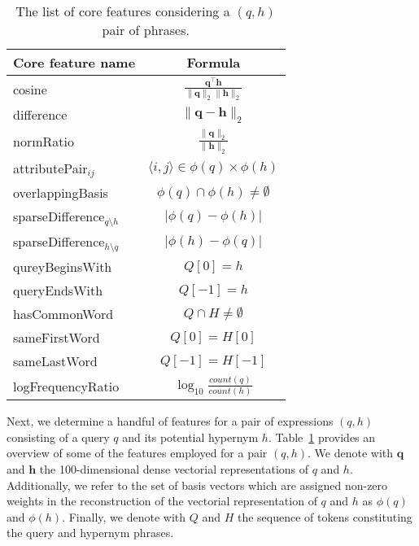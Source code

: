 \documentclass[11pt,a4paper]{article}
\begin{document}
\begin{table}
	\begin{tabular}{lc}
    \toprule
		Core feature name   & Formula \\  
    \midrule
		{cosine}            & $\frac{\mathbf{q}^\intercal \mathbf{h}}{\lVert \mathbf{q} \rVert_2\lVert \mathbf{h} \rVert_2}$ \\ %
		{difference}        & $\lVert \mathbf{q} - \mathbf{h} \rVert_2$ \\ %
		{normRatio}         & $\frac{\lVert \mathbf{q}\rVert_2}{\lVert \mathbf{h} \rVert_2}$ \\ %
    \midrule
    attributePair$_{ij}$      & $\langle i,j\rangle\in\phi(q)\times\phi(h)$ \\ %
		{overlappingBasis}  & $\phi(q) \cap \phi(h) \neq \emptyset$ \\ %
		{sparseDifference$_{q\setminus h}$} & $\lvert \phi(q) - \phi(h) \rvert$ \\ %
		{sparseDifference$_{h\setminus q}$} & $\lvert \phi(h) - \phi(q) \rvert$ \\
    \midrule
		{qureyBeginsWith}   & $Q[0] = h$ \\ %
		{queryEndsWith}     & $Q[-1] = h$ \\
		{hasCommonWord} & $Q \cap H \neq \emptyset$ \\ %
		{sameFirstWord}        & $Q[0] = H[0]$ \\ %
		{sameLastWord}        & $Q[-1] = H[-1]$ \\
		{logFrequencyRatio} & $\log_{10}\frac{count(q)}{count(h)}$ \\ %
    \bottomrule
	\end{tabular}
	\caption{The list of core features considering a $(q,h)$ pair of phrases.}
	\label{table:core_features}
\end{table} 

Next, we determine a handful of features for a pair of expressions $(q, h)$
consisting of a query $q$ and its potential hypernym $h$. 
Table~\ref{table:core_features} provides an overview of some of the features
employed for a pair $(q, h)$. 
We denote with $\mathbf{q}$ and $\mathbf{h}$ the 100-dimensional dense
vectorial representations of $q$ and $h$.
Additionally, we refer to the set of basis vectors which are assigned non-zero
weights in the reconstruction of the vectorial representation of $q$ and $h$ as
$\phi(q)$ and $\phi(h)$.  
Finally, we denote with $Q$ and $H$ the sequence of tokens constituting the
query and hypernym phrases.
 
\end{document}
